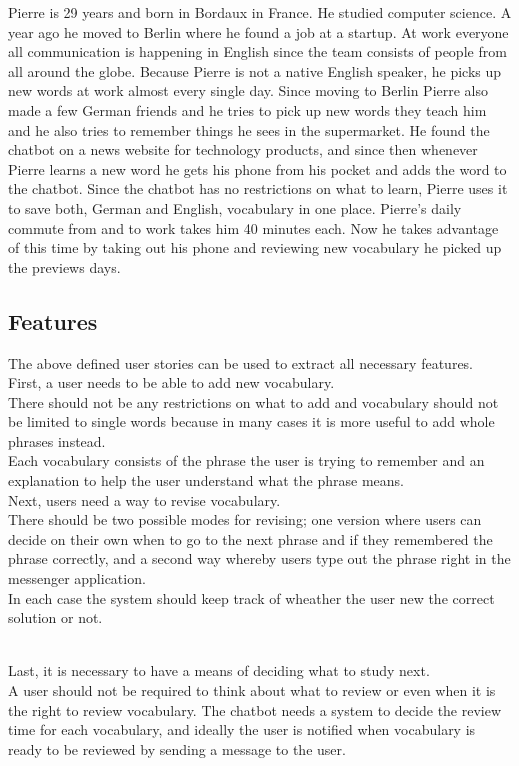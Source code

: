 Pierre is 29 years and born in Bordaux in France.
He studied computer science.
A year ago he moved to Berlin where he found a job at a startup.
At work everyone all communication is happening in English since the team consists of people from all around the globe.
Because Pierre is not a native English speaker, he picks up new words at work almost every single day.
Since moving to Berlin Pierre also made a few German friends and he tries to pick up new words they teach him
and he also tries to remember things he sees in the supermarket.
He found the chatbot on a news website for technology products,
and since then whenever Pierre learns a new word he gets his phone from his pocket and adds the word to the chatbot.
Since the chatbot has no restrictions on what to learn, Pierre uses it to save both, German and English, vocabulary in one place.
Pierre's daily commute from and to work takes him 40 minutes each.
Now he takes advantage of this time by taking out his phone and reviewing new vocabulary he picked up the previews days.
\\


\subsection{Features}

The above defined user stories can be used to extract all necessary features.
\\

First, a user needs to be able to add new vocabulary.
\\
There should not be any restrictions on what to add
and vocabulary should not be limited to single words because in many cases it is more useful
to add whole phrases instead.
\\
Each vocabulary consists of the phrase the user is trying to remember
and an explanation to help the user understand what the phrase means.
\\

Next, users need a way to revise vocabulary.
\\
There should be two possible modes for revising;
one version where users can decide on their own when to go to the next phrase
and if they remembered the phrase correctly,
and a second way whereby users type out the phrase right in the messenger application.
\\
In each case the system should keep track of wheather the user new the correct solution or not.

\\
Last, it is necessary to have a means of deciding what to study next.
\\
A user should not be required to think about what to review or even when it is the right to review vocabulary.
The chatbot needs a system to decide the review time for each vocabulary,
and ideally the user is notified when vocabulary is ready to be reviewed by sending a message to the user.
\\


